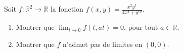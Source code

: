\begin{exercice}\label{exoGeomAnal-0045}

  Soit $f:\mathbb{R}^2\to \mathbb{R}$ la fonction $\displaystyle f(x,y)= \frac{x^2y^5}{4x^4+y^{10}}.$
\begin{enumerate}
\item Montrer que $\displaystyle \lim_{t\to 0 } f(t,at)=0$, pour tout $a\in\mathbb{R}$.
\item Montrer que $f$ n'admet pas de limites en $(0,0)$.
\end{enumerate}


\end{exercice}
